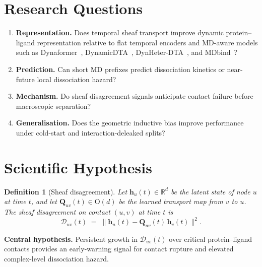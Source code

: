 \documentclass[12pt,a4paper]{article}
\newtheorem{definition}{Definition}
\begin{document}
\section{Research Questions}
\label{sec:rq}

\begin{enumerate}
  \item \textbf{Representation.}
        Does temporal sheaf transport improve dynamic protein--ligand
        representation relative to flat temporal encoders and MD-aware models
        such as Dynaformer~\citep{dynaformer2024},
        DynamicDTA~\citep{dynamicdta2025},
        DynHeter-DTA~\citep{dynheterdta2025}, and MDbind~\citep{mdbind2025}?
  \item \textbf{Prediction.}
        Can short MD prefixes predict dissociation kinetics or near-future
        local dissociation hazard?
  \item \textbf{Mechanism.}
        Do sheaf disagreement signals anticipate contact failure before
        macroscopic separation?
  \item \textbf{Generalisation.}
        Does the geometric inductive bias improve performance under cold-start
        and interaction-deleaked splits?
\end{enumerate}

\section{Scientific Hypothesis}
\label{sec:hypothesis}

\begin{definition}[Sheaf disagreement]
Let $\mathbf{h}_u(t)\in\mathbb{R}^d$ be the latent state of node $u$ at
time $t$, and let $\mathbf{Q}_{uv}(t)\in\mathrm{O}(d)$ be the learned
transport map from $v$ to $u$.
The \emph{sheaf disagreement} on contact $(u,v)$ at time $t$ is
\begin{equation}
  \mathcal{D}_{uv}(t)
  \;=\;
  \bigl\|\mathbf{h}_u(t)-\mathbf{Q}_{uv}(t)\,\mathbf{h}_v(t)\bigr\|^2.
  \label{eq:disagreement}
\end{equation}
\end{definition}

\begin{claimbox}
\textbf{Central hypothesis.}
Persistent growth in $\mathcal{D}_{uv}(t)$ over critical protein--ligand
contacts provides an early-warning signal for contact rupture and elevated
complex-level dissociation hazard.
\end{claimbox}
\end{document}
